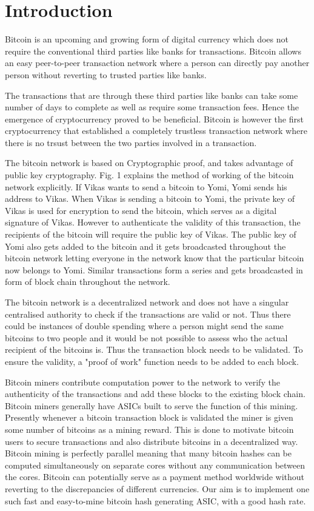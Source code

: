 \section{Introduction}
\label{section:background}
Bitcoin is an upcoming and growing form of digital currency which does not require the conventional third parties like banks for transactions. Bitcoin allows an easy peer-to-peer transaction network where a person can directly pay another person without reverting to trusted parties like banks.

The transactions that are through these third parties like banks can take some number of days to complete as well as require some transaction fees. Hence the emergence of cryptocurrency proved to be beneficial. Bitcoin is however the first cryptocurrency that established a completely trustless transaction network where there is no trsust between the two parties involved in a transaction.

The bitcoin network is based on Cryptographic proof, and takes advantage of public key cryptography. Fig. 1 explains the method of working of the bitcoin network explicitly. If Vikas wants to send a bitcoin to Yomi, Yomi sends his address to Vikas. When Vikas is sending a bitcoin to Yomi, the private key of Vikas is used for encryption to send the bitcoin, which serves as a digital signature of Vikas. However to authenticate the validity of this transaction, the recipients of the bitcoin will require the public key of Vikas. The public key of Yomi also gets added to the bitcoin and it gets broadcasted throughout the bitcoin network letting everyone in the network know that the particular bitcoin now belongs to Yomi. Similar transactions form a series and gets broadcasted in form of block chain throughout the network. 

The bitcoin network is a decentralized network and does not have a singular centralised authority to check if the transactions are valid or not. Thus there could be instances of double spending where a person might send the same bitcoins to two people and it would be not possible to assess who the actual recipient of the bitcoins is. Thus the transaction block needs to be validated. To ensure the validity, a "proof of work" function needs to be added to each block.

Bitcoin miners contribute computation power to the network to verify the authenticity of the transactions and add these blocks to the existing block chain. Bitcoin miners generally have ASICs built to serve the function of this mining. Presently whenever a bitcoin transaction block is validated the miner is given some number of bitcoins as a mining reward. This is done to motivate bitcoin users to secure transactions and also distribute bitcoins in a decentralized way. Bitcoin mining is perfectly parallel meaning that many bitcoin hashes can be computed simultaneously on separate cores without any communication between the cores.  Bitcoin can potentially serve as a payment method worldwide without reverting to the discrepancies of different currencies. Our aim is to implement one such fast and easy-to-mine bitcoin hash generating ASIC, with a good hash rate.

